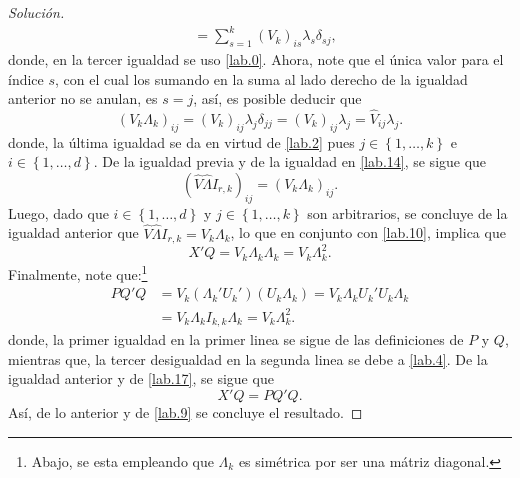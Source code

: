 \documentclass[10.5pt,notitlepage]{article}
\newenvironment{solucion}
  {\begin{proof}[Solución]}
  {\end{proof}}
\newcommand{\kis}[1]{\left\{ #1 \right\}}
\theoremstyle{plain}
\begin{document}
\begin{solucion}
\begin{align*}
                   &= \sum_{s = 1}^{k}(V_{k})_{is}\lambda_{s}\delta_{sj}, 
\end{align*}
donde, en la tercer igualdad se uso \eqref{lab.0}. Ahora, note que el única valor para el índice \(s\), con el cual los sumando en la suma al lado derecho de la igualdad anterior no se anulan, es  \(s = j\), así, es posible deducir que 
\[
  (V_{k}\Lambda_{k})_{ij} = (V_{k})_{ij}\lambda_{j}\delta_{jj} =  (V_{k})_{ij}\lambda_{j} = \hat{V}_{ij}\lambda_{j}. 
\]
donde, la última igualdad se da en virtud de \eqref{lab.2} pues \(j \in \kis{1, \hdots, k}\) e \(i \in \kis{1,\hdots, d}\). De la igualdad previa y de la igualdad en \eqref{lab.14}, se sigue que
\[
  (\hat{V}\hat{\Lambda}I_{r,k})_{ij}  =  (V_{k}\Lambda_{k})_{ij}. 
\]
Luego, dado que \(i \in \kis{1, \hdots, d}\) y \(j \in \kis{1, \hdots, k}\) son arbitrarios, se concluye de la igualdad anterior que \(\hat{V}\hat{\Lambda}I_{r,k} = V_{k}\Lambda_{k}\), lo que en conjunto con \eqref{lab.10}, implica que 
\begin{equation}\label{lab.17}
    X'Q = V_{k}\Lambda_{k}\Lambda_{k} =  V_{k}\Lambda_{k}^2.
\end{equation}
Finalmente, note que:\footnote{Abajo, se esta empleando que \(\Lambda_{k}\) es simétrica por ser una mátriz diagonal. }
\begin{align*}
PQ'Q &= V_k(\Lambda_{k}'U_{k}')( U_{k}\Lambda_{k}) = V_k\Lambda_{k}U_{k}' U_{k}\Lambda_{k}\\ 
     &=V_k\Lambda_{k}I_{k,k}\Lambda_{k} = V_{k}\Lambda_{k}^2. 
\end{align*}
donde, la primer igualdad en la primer linea se sigue de las definiciones de \(P\) y \(Q\), mientras que, la tercer desigualdad en la segunda linea se debe a \eqref{lab.4}. De la igualdad anterior y de \eqref{lab.17}, se sigue que
\[
 X'Q = PQ'Q.
\]
Así, de lo anterior y de \eqref{lab.9} se concluye el resultado.
\end{solucion}
\end{document}
